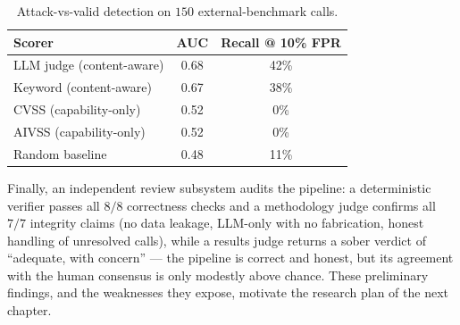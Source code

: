 \begin{table}[H]
    \centering
    \caption{Attack-vs-valid detection on $150$ external-benchmark calls.}
    \label{tab:external}
    \begin{tabular}{l c c}
        \hline
        \textbf{Scorer} & \textbf{AUC} & \textbf{Recall @ 10\% FPR} \\
        \hline
        LLM judge (content-aware) & 0.68 & 42\% \\
        Keyword (content-aware)   & 0.67 & 38\% \\
        CVSS (capability-only)    & 0.52 & 0\%  \\
        AIVSS (capability-only)   & 0.52 & 0\%  \\
        Random baseline           & 0.48 & 11\% \\
        \hline
    \end{tabular}
\end{table}

Finally, an independent review subsystem audits the pipeline: a deterministic
verifier passes all $8/8$ correctness checks and a methodology judge confirms all
$7/7$ integrity claims (no data leakage, LLM-only with no fabrication, honest
handling of unresolved calls), while a results judge returns a sober verdict of
``adequate, with concern'' --- the pipeline is correct and honest, but its
agreement with the human consensus is only modestly above chance. These
preliminary findings, and the weaknesses they expose, motivate the research plan
of the next chapter.

